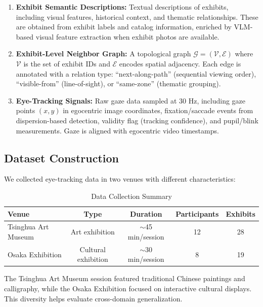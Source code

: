 \documentclass[letterpaper]{article}
\begin{document}
\begin{enumerate}
    \item \textbf{Exhibit Semantic Descriptions:} Textual descriptions of exhibits, including visual features, historical context, and thematic relationships. These are obtained from exhibit labels and catalog information, enriched by VLM-based visual feature extraction when exhibit photos are available.

    \item \textbf{Exhibit-Level Neighbor Graph:} A topological graph $\mathcal{G} = (\mathcal{V}, \mathcal{E})$ where $\mathcal{V}$ is the set of exhibit IDs and $\mathcal{E}$ encodes spatial adjacency. Each edge is annotated with a relation type: ``next-along-path'' (sequential viewing order), ``visible-from'' (line-of-sight), or ``same-zone'' (thematic grouping).

    \item \textbf{Eye-Tracking Signals:} Raw gaze data sampled at 30 Hz, including gaze points $(x, y)$ in egocentric image coordinates, fixation/saccade events from dispersion-based detection, validity flag (tracking confidence), and pupil/blink measurements. Gaze is aligned with egocentric video timestamps.
\end{enumerate}

\subsection{Dataset Construction}

We collected eye-tracking data in two venues with different characteristics:

\begin{table}[h]
\centering
\caption{Data Collection Summary}
\begin{tabular}{lcccc}
\toprule
Venue & Type & Duration & Participants & Exhibits \\
\midrule
Tsinghua Art Museum & Art exhibition & $\sim$45 min/session & 12 & 28 \\
Osaka Exhibition & Cultural exhibition & $\sim$30 min/session & 8 & 19 \\
\bottomrule
\end{tabular}
\end{table}

The Tsinghua Art Museum session featured traditional Chinese paintings and calligraphy, while the Osaka Exhibition focused on interactive cultural displays. This diversity helps evaluate cross-domain generalization.
\end{document}
